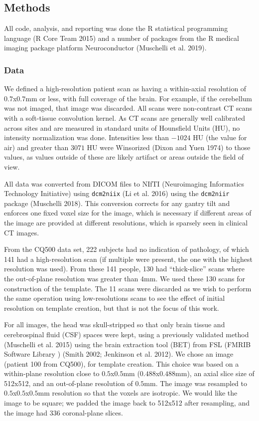 \documentclass[]{elsarticle} %
\begin{document}
\hypertarget{methods}{%
\subsection{Methods}\label{methods}}

All code, analysis, and reporting was done the R statistical programming language (R Core Team 2015) and a number of packages from the R medical imaging package platform Neuroconductor (Muschelli et al. 2019).

\hypertarget{data}{%
\subsubsection{Data}\label{data}}

We defined a high-resolution patient scan as having a within-axial resolution of \(0.7\)x\(0.7\)mm or less, with full coverage of the brain. For example, if the cerebellum was not imaged, that image was discarded. All scans were non-contrast CT scans with a soft-tissue convolution kernel. As CT scans are generally well calibrated across sites and are measured in standard units of Hounsfield Units (HU), no intensity normalization was done. Intensities less than \(-1024\) HU (the value for air) and greater than \(3071\) HU were Winsorized (Dixon and Yuen 1974) to those values, as values outside of these are likely artifact or areas outside the field of view.

All data was converted from DICOM files to NIfTI (Neuroimaging Informatics Technology Initiative) using \texttt{dcm2niix} (Li et al. 2016) using the \texttt{dcm2niir} package (Muschelli 2018). This conversion corrects for any gantry tilt and enforces one fixed voxel size for the image, which is necessary if different areas of the image are provided at different resolutions, which is sparsely seen in clinical CT images.

From the CQ500 data set, 222 subjects had no indication of pathology, of which 141 had a high-resolution scan (if multiple were present, the one with the highest resolution was used). From these 141 people, 130 had ``thick-slice'' scans where the out-of-plane resolution was greater than \(4\)mm. We used these 130 scans for construction of the template. The 11 scans were discarded as we wish to perform the same operation using low-resolutions scans to see the effect of initial resolution on template creation, but that is not the focus of this work.

For all images, the head was skull-stripped so that only brain tissue and cerebrospinal fluid (CSF) spaces were kept, using a previously validated method (Muschelli et al. 2015) using the brain extraction tool (BET) from FSL (FMRIB Software Library
) (Smith 2002; Jenkinson et al. 2012). We chose an image (patient 100 from CQ500), for template creation. This choice was based on a within-plane resolution close to \(0.5\)x\(0.5\)mm (\(0.488\)x\(0.488\)mm), an axial slice size of 512x512, and an out-of-plane resolution of \(0.5\)mm. The image was resampled to \(0.5\)x\(0.5\)x\(0.5\)mm resolution so that the voxels are isotropic. We would like the image to be square; we padded the image back to 512x512 after resampling, and the image had 336 coronal-plane slices.
\end{document}
